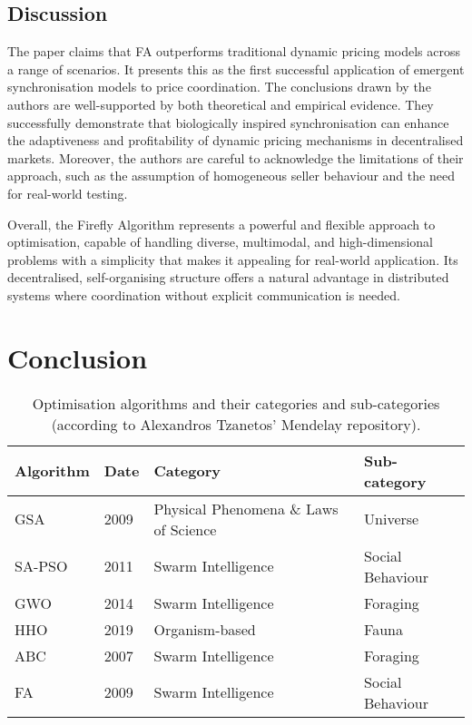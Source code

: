 \documentclass[a4paper, 12pt]{extarticle}
\begin{document}
\subsection{Discussion}

The paper \cite{jumadinova2008firefly} claims that FA outperforms traditional dynamic pricing models across a range of scenarios. It presents this as the first successful application of emergent synchronisation models to price coordination. The conclusions drawn by the authors are well-supported by both theoretical and empirical evidence. They successfully demonstrate that biologically inspired synchronisation can enhance the adaptiveness and profitability of dynamic pricing mechanisms in decentralised markets. Moreover, the authors are careful to acknowledge the limitations of their approach, such as the assumption of homogeneous seller behaviour and the need for real-world testing.  

Overall, the Firefly Algorithm represents a powerful and flexible approach to optimisation, capable of handling diverse, multimodal, and high-dimensional problems with a simplicity that makes it appealing for real-world application. Its decentralised, self-organising structure offers a natural advantage in distributed systems where coordination without explicit communication is needed. 


\newpage
\section{Conclusion}

\begin{table}[h!]
    \centering
    \begin{tabular}{l l p{7cm} l} 
        \toprule
        \textbf{Algorithm} & \textbf{Date} & \textbf{Category} & \textbf{Sub-category} \\
        \midrule
        GSA         & 2009 & Physical Phenomena \& Laws of Science      & Universe  \\
        SA-PSO      & 2011 & Swarm Intelligence                         & Social Behaviour \\
        GWO         & 2014 & Swarm Intelligence                         & Foraging \\
        HHO         & 2019 & Organism-based                             & Fauna \\
        ABC         & 2007 & Swarm Intelligence                         & Foraging \\
        FA          & 2009 & Swarm Intelligence                         & Social Behaviour \\
        \bottomrule
    \end{tabular}
    \caption{Optimisation algorithms and their categories and sub-categories (according to Alexandros Tzanetos' Mendelay repository).}
\end{table}
\end{document}
